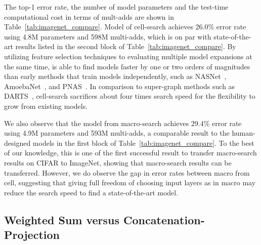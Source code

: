 The top-1 error rate, the number of model parameters and the test-time computational cost in terms of mult-adds are shown in Table~\ref{tab:imagenet_compare}. Model of \Petridish cell-search achieves 26.0\% error rate using 4.8M parameters and 598M multi-adds, which is on par with state-of-the-art results listed in the second block of Table~\ref{tab:imagenet_compare}. By utilizing feature selection techniques to evaluating multiple model expansions at the same time, \Petridish is able to find models faster by one or two orders of magnitudes than early methods that train models independently, such as NASNet~\citep{NASCell}, AmoebaNet~\citep{Real2018RegularizedEF}, and PNAS~\citep{Liu2017ProgressiveNA}.  
In comparison to super-graph methods such as DARTS~\citep{Liu2018DARTSDA}, \Petridish cell-search sacrifices about four times search speed for the flexibility to grow from existing models. 

We also observe that the model from \Petridish macro-search achieves 29.4\% error rate using 4.9M parameters and 593M multi-adds, a comparable result to the human-designed models in the first block of Table~\ref{tab:imagenet_compare}. To the best of our knowledge, this is one of the first successful result to transfer macro-search results on CIFAR to ImageNet, showing that macro-search results can be transferred. 
However, we do observe the gap in error rates between \Petridish macro from \Petridish cell, suggesting that giving full freedom of choosing input layers as in \Petridish macro may reduce the search speed to find a state-of-the-art model.


\subsection{Weighted Sum versus Concatenation-Projection}
\label{sec:sum_vs_cat_proj}



